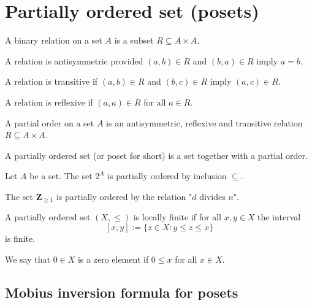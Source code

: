 \section{Partially ordered set (posets)}
\begin{definition}
A binary relation on a set $A$ is a subset $R\subseteq A\times A$.
\end{definition}
\begin{definition}
A relation is antisymmetric provided $(a,b)\in R$ and $(b,a)\in R$ imply $a=b$.
\end{definition}
\begin{definition}
A relation is transitive if $(a,b)\in R$ and $(b,c)\in R$ imply $(a,c)\in R$.
\end{definition}
\begin{definition}
A relation is reflexive if $(a,a)\in R$ for all $a\in R$.
\end{definition}
\begin{definition}
A partial order on a set $A$ is an antisymmetric, reflexive and transitive relation $R\subseteq A\times A$. 
\end{definition}
\begin{definition}
A partially ordered set (or poset for short) is a set together with a partial order.
\end{definition}
\begin{example}
Let $A$ be a set. The set $2^{A}$ is partially ordered by inclusion $\subseteq$.
\end{example}
\begin{example}
The set $\mathbf{Z}_{\ge 1}$ is partially ordered by the relation "$d$ divides $n$".
\end{example}
\begin{definition}
A partially ordered set $(X,\le)$ is locally finite if for all $x,y\in X$ the interval
$$
[x,y]:= \{ z\in X:y\le z \le x \}
$$
is finite.

We say that $0\in X$ is a zero element if $0\le x$ for all $x \in X$.
\end{definition}

\subsection{Mobius inversion formula for posets}

